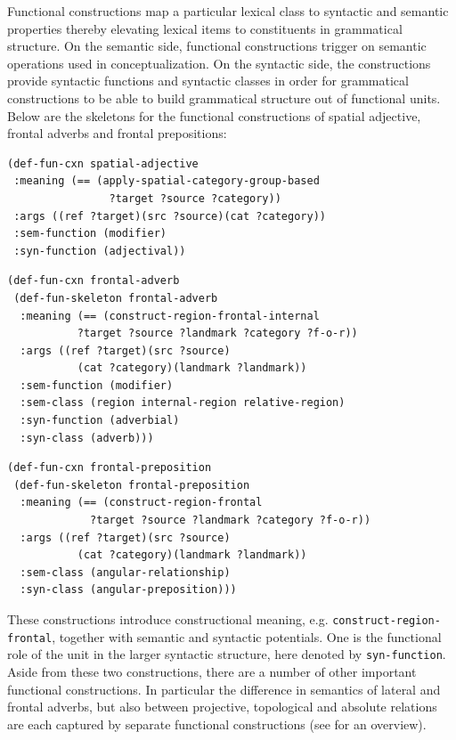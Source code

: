 Functional constructions map a particular lexical 
class to syntactic and semantic properties thereby
elevating lexical items to constituents in grammatical structure. 
On the semantic side, functional constructions trigger on semantic operations 
used in conceptualization. On the syntactic side, the constructions 
provide syntactic functions and syntactic classes in order for grammatical constructions 
to be able to build grammatical structure out of functional units.
Below are the skeletons for the functional constructions of spatial 
adjective, frontal adverbs and frontal prepositions:

\ea
\label{e:def-fun-spatial-adjective}
\begin{lstlisting}
(def-fun-cxn spatial-adjective 
 :meaning (== (apply-spatial-category-group-based 
                ?target ?source ?category))
 :args ((ref ?target)(src ?source)(cat ?category))
 :sem-function (modifier)
 :syn-function (adjectival))
\end{lstlisting}
\z

\ea
\label{e:def-fun-frontal-adverb}
\begin{lstlisting}
(def-fun-cxn frontal-adverb 
 (def-fun-skeleton frontal-adverb
  :meaning (== (construct-region-frontal-internal
           ?target ?source ?landmark ?category ?f-o-r))
  :args ((ref ?target)(src ?source)
           (cat ?category)(landmark ?landmark))
  :sem-function (modifier)
  :sem-class (region internal-region relative-region)
  :syn-function (adverbial)
  :syn-class (adverb)))
\end{lstlisting}
\z

\ea
\label{e:def-fun-frontal-preposition}
\begin{lstlisting}
(def-fun-cxn frontal-preposition
 (def-fun-skeleton frontal-preposition
  :meaning (== (construct-region-frontal 
             ?target ?source ?landmark ?category ?f-o-r))
  :args ((ref ?target)(src ?source)
           (cat ?category)(landmark ?landmark))
  :sem-class (angular-relationship)
  :syn-class (angular-preposition)))
\end{lstlisting}
\z

These constructions introduce constructional meaning, e.g. 
{\footnotesize\tt construct-region-frontal}, together with semantic 
and syntactic potentials. One is the functional role of the
unit in the larger syntactic structure, here denoted by 
{\footnotesize\tt syn-function}. Aside from these two constructions, there are 
a number of other important functional constructions. 
In particular the difference in semantics of
lateral and frontal adverbs, but also between projective, topological
and absolute relations are each captured by separate 
functional constructions (see  for an overview).


